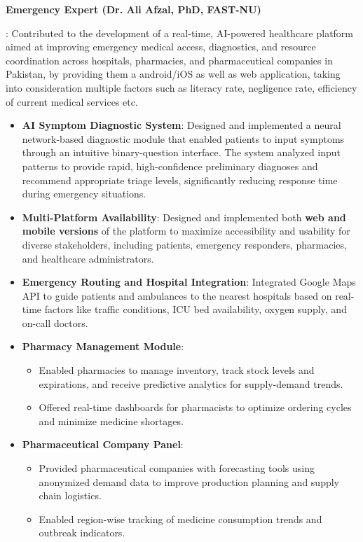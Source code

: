 \documentclass[letterpaper,10pt]{article}
\newcommand{\resumeItem}[2]{
  \item\small{
    \textbf{#1}{: #2 \vspace{-2pt}}
  }
}
\newcommand{\resumeSubItem}[2]{\resumeItem{#1}{#2}\vspace{-4pt}}
\begin{document}
\resumeSubItem{Emergency Expert (Dr. Ali Afzal, PhD, FAST-NU)}
{Contributed to the development of a real-time, AI-powered healthcare platform aimed at improving emergency medical access, diagnostics, and resource coordination across hospitals, pharmacies, and pharmaceutical companies in Pakistan, by providing them a android/iOS as well as web application, taking into consideration multiple factors such as literacy rate, negligence rate, efficiency of current medical services etc.
\begin{itemize}
    \item \textbf{AI Symptom Diagnostic System}: Designed and implemented a neural network-based diagnostic module that enabled patients to input symptoms through an intuitive binary-question interface. The system analyzed input patterns to provide rapid, high-confidence preliminary diagnoses and recommend appropriate triage levels, significantly reducing response time during emergency situations.
    \item \textbf{Multi-Platform Availability}: Designed and implemented both \textbf{web and mobile versions} of the platform to maximize accessibility and usability for diverse stakeholders, including patients, emergency responders, pharmacies, and healthcare administrators.
    \item \textbf{Emergency Routing and Hospital Integration}: Integrated Google Maps API to guide patients and ambulances to the nearest hospitals based on real-time factors like traffic conditions, ICU bed availability, oxygen supply, and on-call doctors.
    \item \textbf{Pharmacy Management Module}:
    \begin{itemize}
        \item Enabled pharmacies to manage inventory, track stock levels and expirations, and receive predictive analytics for supply-demand trends.
        \item Offered real-time dashboards for pharmacists to optimize ordering cycles and minimize medicine shortages.
    \end{itemize}
    \item \textbf{Pharmaceutical Company Panel}:
    \begin{itemize}
        \item Provided pharmaceutical companies with forecasting tools using anonymized demand data to improve production planning and supply chain logistics.
        \item Enabled region-wise tracking of medicine consumption trends and outbreak indicators.

\end{itemize}
\end{itemize}}
\end{document}
